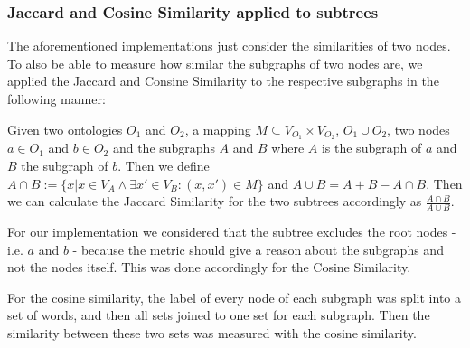 \documentclass[runningheads]{llncs}
\begin{document}
\subsubsection{Jaccard and Cosine Similarity applied to subtrees} \label{jaccard_subtrees}
The aforementioned implementations just consider the similarities of two nodes. To also be able to measure how similar the subgraphs of two nodes are, we applied the Jaccard and Consine Similarity to the respective subgraphs in the following manner:

Given two ontologies $O_1$ and $O_2$, a mapping $M \subseteq V_{O_1} \times V_{O_2}$, $O_1 \cup O_2$, two nodes $a \in O_1$ and $b \in O_2$ and the subgraphs $A$ and $B$ where $A$ is the subgraph of $a$ and $B$ the subgraph of $b$. Then we define  $A \cap B := \{ x | x \in V_A \land \exists x' \in V_B:(x,x') \in M\}$ and $A \cup B = A + B - A \cap B$. Then we can calculate the Jaccard Similarity for the two subtrees accordingly as $\frac{A \cap B}{A \cup B}$.

For our implementation we considered that the subtree excludes the root nodes - i.e. $a$ and $b$ - because the metric should give a reason about the subgraphs and not the nodes itself. This was done accordingly for the Cosine Similarity.

For the cosine similarity, the label of every node of each subgraph was split into a set of words, and then all sets joined to one set for each subgraph. Then the similarity between these two sets was measured with the cosine similarity.
\end{document}
